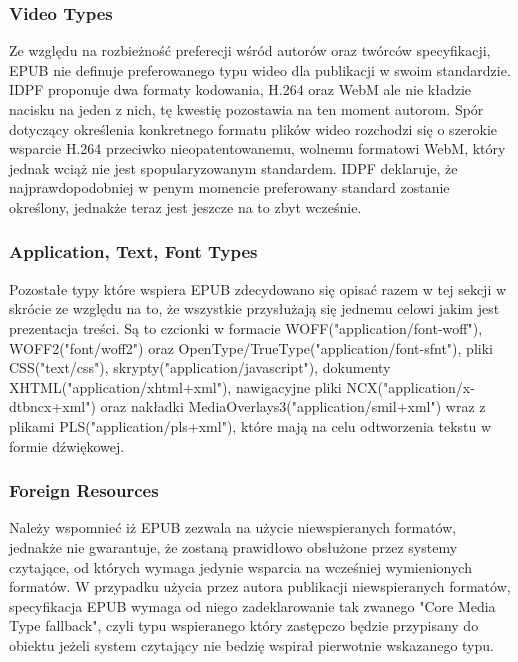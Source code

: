 \subsubsection*{Video Types}

Ze względu na rozbieżność preferecji wśród autorów oraz twórców specyfikacji, EPUB nie definuje preferowanego typu wideo dla publikacji
w swoim standardzie. IDPF proponuje dwa formaty kodowania, H.264 oraz WebM ale nie kładzie nacisku na jeden z nich, tę kwestię pozostawia
na ten moment autorom. Spór dotyczący określenia konkretnego formatu plików wideo rozchodzi się o szerokie wsparcie H.264 przeciwko
nieopatentowanemu, wolnemu formatowi WebM, który jednak wciąż nie jest spopularyzowanym standardem. IDPF deklaruje, że najprawdopodobniej
w penym momencie preferowany standard zostanie określony, jednakże teraz jest jeszcze na to zbyt wcześnie\cite{WhatIsEPUB3Video}.

\subsubsection*{Application, Text, Font Types}

Pozostałe typy które wspiera EPUB zdecydowano się opisać razem w tej sekcji w skrócie ze względu na to, że wszystkie przysłużają się
jednemu celowi jakim jest prezentacja treści. Są to czcionki w formacie WOFF("application/font-woff"), WOFF2("font/woff2") oraz
OpenType/TrueType("application/font-sfnt"), pliki CSS("text/css"), skrypty("application/javascript"), dokumenty XHTML("application/xhtml+xml"),
nawigacyjne pliki NCX("application/x-dtbncx+xml") oraz nakładki MediaOverlays3("application/smil+xml") wraz z plikami PLS("application/pls+xml"),
które mają na celu odtworzenia tekstu w formie dźwiękowej\cite{EPUBCoreMediaTypes}.

\subsubsection*{Foreign Resources}

Należy wspomnieć iż EPUB zezwala na użycie niewspieranych formatów, jednakże nie gwarantuje, że zostaną prawidłowo obsłużone przez systemy
czytające, od których wymaga jedynie wsparcia na wcześniej wymienionych formatów. W przypadku użycia przez autora publikacji niewspieranych
formatów, specyfikacja EPUB wymaga od niego zadeklarowanie tak zwanego "Core Media Type fallback", czyli typu wspieranego który zastępczo będzie
przypisany do obiektu jeżeli system czytający nie bedzię wspirał pierwotnie wskazanego typu\cite{EPUBSpecificationForeignResources}.
